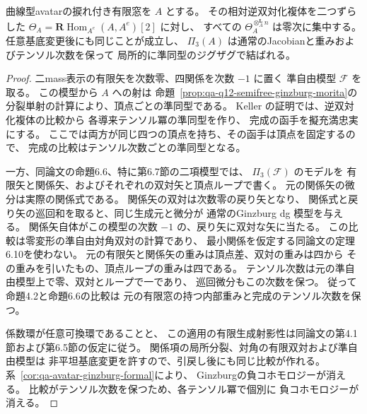 \begin{corollary}[幾何avatarの相対Serreテンソル冪の零次集中]
\label{cor:qa-avatar-preprojective-formal}
曲線型avatarの捩れ付き有限窓を $A$ とする。
その相対逆双対化複体を二つずらした
$\Theta_A=\mathbf R\operatorname{Hom}_{A^e}(A,A^e)[2]$ に対し、
すべての $\Theta_A^{\otimes_A^{\mathbf L}n}$ は零次に集中する。
任意基底変更後にも同じことが成立し、
$\Pi_3(A)$ は通常のJacobianと重みおよびテンソル次数を保って
局所的に準同型のジグザグで結ばれる。
\end{corollary}
\begin{proof}
二mass表示の有限矢を次数零、四関係を次数 $-1$ に置く
準自由模型 $\mathscr F$ を取る。
この模型から $A$ への射は
命題~\ref{prop:qa-q12-semifree-ginzburg-morita}の
分裂単射の計算により、頂点ごとの準同型である。
Keller \cite[Proposition~4.2]{KellerDeformedCY2011}の証明では、逆双対化複体の比較から
各導来テンソル冪の準同型を作り、
完成の函手を擬充満忠実にする。
ここでは両方が同じ四つの頂点を持ち、その函手は頂点を固定するので、
完成の比較はテンソル次数ごとの準同型となる。

一方、同論文の命題6.6、特に第6.7節の二項模型では、
$\Pi_3(\mathscr F)$ のモデルを
有限矢と関係矢、およびそれぞれの双対矢と頂点ループで書く。
元の関係矢の微分は実際の関係式である。
関係矢の双対は次数零の戻り矢となり、
関係式と戻り矢の巡回和を取ると、同じ生成元と微分が
通常のGinzburg dg 模型を与える。
関係矢自体がこの模型の次数 $-1$ の、戻り矢に双対な矢に当たる。
この比較は零変形の準自由対角双対の計算であり、
最小関係を仮定する同論文の定理6.10を使わない。
元の有限矢と関係矢の重みは頂点差、双対の重みは四から
その重みを引いたもの、頂点ループの重みは四である。
テンソル次数は元の準自由模型上で零、双対とループで一であり、
巡回微分もこの次数を保つ。
従って命題4.2と命題6.6の比較は
元の有限窓の持つ内部重みと完成のテンソル次数を保つ。

係数環が任意可換環であることと、
この適用の有限生成射影性は同論文の第4.1節および第6.5節の仮定に従う。
関係項の局所分裂、対角の有限双対および準自由模型は
非平坦基底変更を許すので、引戻し後にも同じ比較が作れる。
系~\ref{cor:qa-avatar-ginzburg-formal}により、
Ginzburgの負コホモロジーが消える。
比較がテンソル次数を保つため、各テンソル冪で個別に
負コホモロジーが消える。
\end{proof}

